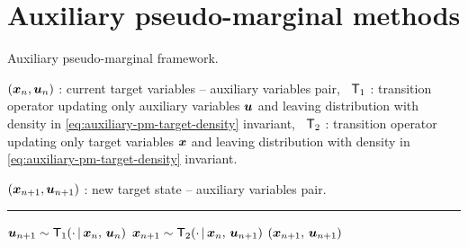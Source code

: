 
\section{Auxiliary pseudo-marginal methods}

\begin{algorithm}[!t]
\caption{Auxiliary pseudo-marginal framework.}
\label{alg:auxiliary-pseudo-marginal}
\begin{algorithmic}
\small
    \Require
    $(\boldsymbol{x}_n, \boldsymbol{u}_n)$ : current target variables -- auxiliary variables pair,~
    $\mathsf{T}_1$ : transition operator updating only auxiliary variables $\boldsymbol{u}$ and leaving distribution with density in \eqref{eq:auxiliary-pm-target-density} invariant,~
    $\mathsf{T}_2$ : transition operator updating only target variables $\boldsymbol{x}$ and leaving distribution with density in \eqref{eq:auxiliary-pm-target-density} invariant.
    \Ensure\raggedright
    $(\boldsymbol{x}_{n+1}, \boldsymbol{u}_{n+1})$ : new target state  -- auxiliary variables pair.
\end{algorithmic}
\hrule
\small
\begin{algorithmic}[1]
  \State $\boldsymbol{u}_{n+1} \sim \mathsf{T}_1(\cdot \operatorname{|} \boldsymbol{x}_n,\,\boldsymbol{u}_n)$
  \State $\boldsymbol{x}_{n+1} \sim \mathsf{T}_2(\cdot \operatorname{|} \boldsymbol{x}_n,\,\boldsymbol{u}_{n+1})$
  \State \Return $(\boldsymbol{x}_{n+1},\, \boldsymbol{u}_{n+1})$
\end{algorithmic}
\end{algorithm}

